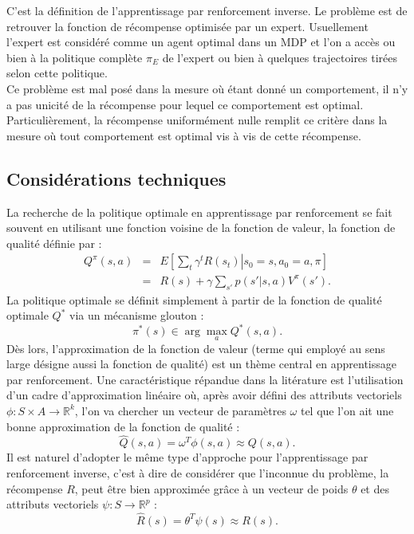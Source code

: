 \documentclass[publibook-draft]{CAp2012}
\begin{document}
C'est la définition de l'apprentissage par renforcement inverse. Le problème est de retrouver la fonction de récompense optimisée par un expert. Usuellement l'expert est considéré comme un agent optimal dans un MDP et l'on a accès ou bien à la politique complète $\pi_E$ de l'expert ou bien à quelques trajectoires tirées selon cette politique.\\

Ce problème est mal posé dans la mesure où étant donné un comportement, il n'y a pas unicité de la récompense pour lequel ce comportement est optimal. Particulièrement, la récompense uniformément nulle remplit ce critère dans la mesure où tout comportement est optimal vis à vis de cette récompense.
\subsection{Considérations techniques}
La recherche de la politique optimale en apprentissage par renforcement se fait souvent en utilisant une fonction voisine de la fonction de valeur, la fonction de qualité définie par :
\begin{eqnarray}
Q^\pi(s,a) &=& E\left[\left.\sum_t\gamma^tR(s_t)\right|s_0=s,a_0=a,\pi\right]\\
&=& R(s) + \gamma\sum_{s'}p(s'|s,a)V^\pi(s').
\end{eqnarray}
La politique optimale se définit simplement à partir de la fonction de qualité optimale $Q^*$ via un mécanisme glouton :
\begin{equation}
\label{greedy.eqn}
\pi^*(s) \in \arg\max_a Q^*(s,a).
\end{equation}
Dès lors, l'approximation de la fonction de valeur (terme qui employé au sens large désigne aussi la fonction de qualité) est un thème central en apprentissage par renforcement. Une caractéristique répandue dans la litérature est l'utilisation d'un cadre d'approximation linéaire où, après avoir défini des attributs vectoriels $\phi: S\times A \rightarrow \mathbb{R}^k$, l'on va chercher un vecteur de paramètres $\omega$ tel que l'on ait une bonne approximation de la fonction de qualité :
\begin{equation}
\hat Q (s,a) = \omega^T\phi(s,a)\approx Q(s,a).
\end{equation}
Il est naturel d'adopter le même type d'approche pour l'apprentissage par renforcement inverse, c'est à dire de considérer que l'inconnue du problème, la récompense $R$, peut être bien approximée grâce à un vecteur de poids $\theta$ et des attributs vectoriels $\psi : S\rightarrow \mathbb{R}^p$ :
\begin{equation}
\label{hatRdef.eqn}
\hat R(s) = \theta^T\psi(s)\approx R(s).
\end{equation}
\end{document}
